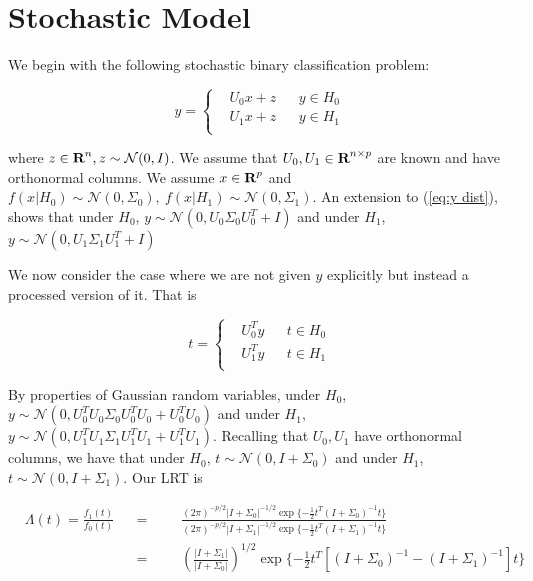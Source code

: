 \documentclass[english]{article}
\begin{document}
\section*{Stochastic Model}

We begin with the following stochastic binary classification problem:

\begin{equation}
y=\left\{
\begin{aligned}
&U_0x+z
&& y\in H_0\\
&U_1x+z
&& y\in H_1\\
\end{aligned}\right.
\end{equation}

where $z\in{\mbox{\bf R}}^n, z\sim\mathcal{N}(0,I)$. We assume that $U_0,U_1\in{\mbox{\bf R}}^{n\times p}$ are known and have orthonormal columns. We assume $x\in{\mbox{\bf R}}^p$ and $f(x|H_0)\sim\mathcal{N}(0,\Sigma_0),~f(x|H_1)\sim\mathcal{N}(0,\Sigma_1)$. An extension to (\ref{eq:y dist}), shows that under $H_0$, $y\sim\mathcal{N}(0, U_0\Sigma_0U_0^T + I)$ and under $H_1$, $y\sim\mathcal{N}(0, U_1\Sigma_1U_1^T + I)$

We now consider the case where we are not given $y$ explicitly but instead a processed version of it. That is

\begin{equation}
t=\left\{
\begin{aligned}
&U_0^Ty
&& t\in H_0\\
&U_1^Ty
&& t\in H_1\\
\end{aligned}\right.
\end{equation}

By properties of Gaussian random variables, under $H_0$, $y\sim\mathcal{N}(0, U_0^TU_0\Sigma_0U_0^TU_0 + U_0^TU_0)$ and under $H_1$, $y\sim\mathcal{N}(0, U_1^TU_1\Sigma_1U_1^TU_1 + U_1^TU_1)$. Recalling that $U_0,U_1$ have orthonormal columns, we have that under $H_0$, $t\sim\mathcal{N}(0,I+\Sigma_0)$ and under $H_1$, $t\sim\mathcal{N}(0,I+\Sigma_1)$. Our LRT is

\begin{equation}
\begin{aligned}
&\Lambda(t) = \frac{f_1(t)}{f_0(t)}
&& =
&&&\frac{(2\pi)^{-p/2}|I+\Sigma_0|^{-1/2}\exp\{-\frac{1}{2}t^T(I+\Sigma_0)^{-1}t\}}{(2\pi)^{-p/2}|I+\Sigma_1|^{-1/2}\exp\{-\frac{1}{2}t^T(I+\Sigma_1)^{-1}t\}}\\
&&& =
&&& \left(\frac{|I+\Sigma_1|}{|I+\Sigma_0|}\right)^{1/2}\exp\{-\frac{1}{2}t^T\left[\left(I+\Sigma_0\right)^{-1}-\left(I+\Sigma_1\right)^{-1}\right]t\}\\
\end{aligned}
\end{equation}
\end{document}

